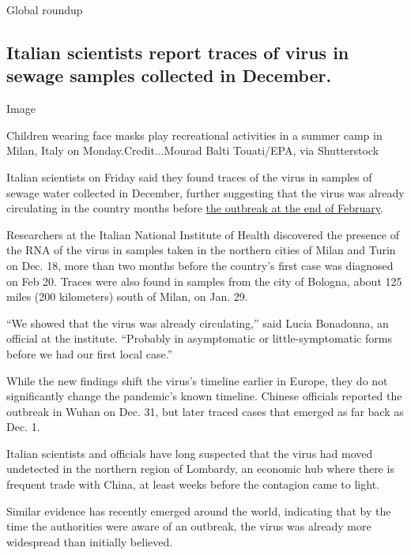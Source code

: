 Global roundup

\hypertarget{italian-scientists-report-traces-of-virus-in-sewage-samples-collected-in-december}{%
\subsection{Italian scientists report traces of virus in sewage samples
collected in
December.}\label{italian-scientists-report-traces-of-virus-in-sewage-samples-collected-in-december}}

Image

Children wearing face masks play recreational activities in a summer
camp in Milan, Italy on Monday.Credit...Mourad Balti Touati/EPA, via
Shutterstock

Italian scientists on Friday said they found traces of the virus in
samples of sewage water collected in December, further suggesting that
the virus was already circulating in the country months before
\href{https://www.nytimes3xbfgragh.onion/2020/03/21/world/europe/italy-coronavirus-center-lessons.html}{the
outbreak at the end of February}.

Researchers at the Italian National Institute of Health discovered the
presence of the RNA of the virus in samples taken in the northern cities
of Milan and Turin on Dec. 18, more than two months before the country's
first case was diagnosed on Feb 20. Traces were also found in samples
from the city of Bologna, about 125 miles (200 kilometers) south of
Milan, on Jan. 29.

``We showed that the virus was already circulating,'' said Lucia
Bonadonna, an official at the institute. ``Probably in asymptomatic or
little-symptomatic forms before we had our first local case.''

While the new findings shift the virus's timeline earlier in Europe,
they do not significantly change the pandemic's known timeline. Chinese
officials reported the outbreak in Wuhan on Dec. 31, but later traced
cases that emerged as far back as Dec. 1.

Italian scientists and officials have long suspected that the virus had
moved undetected in the northern region of Lombardy, an economic hub
where there is frequent trade with China, at least weeks before the
contagion came to light.

Similar evidence has recently emerged around the world, indicating that
by the time the authorities were aware of an outbreak, the virus was
already more widespread than initially believed.


